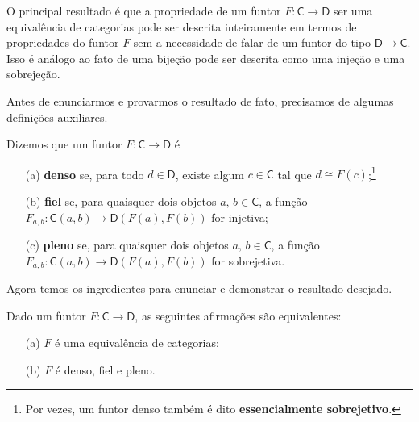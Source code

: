 O principal resultado é que a propriedade de um funtor $F: \mathsf{C} \to \mathsf{D}$ ser uma equivalência de categorias pode ser descrita inteiramente em termos de propriedades do funtor $F$ sem a necessidade de falar de um funtor do tipo $\mathsf{D} \to \mathsf{C}$.
Isso é análogo ao fato de uma bijeção pode ser descrita como uma injeção e uma sobrejeção.

Antes de enunciarmos e provarmos o resultado de fato, precisamos de algumas definições auxiliares.

\begin{defin}
  Dizemos que um funtor $F: \mathsf{C} \to \mathsf{D}$ é
  \begin{enumerate}
  \item[(a)] \textbf{denso} se, para todo $d \in \mathsf{D}$, existe algum $c \in \mathsf{C}$ tal que $d \cong F(c)$;\footnote{Por vezes, um funtor denso também é dito \textbf{essencialmente sobrejetivo}.}
    
  \item[(b)] \textbf{fiel} se, para quaisquer dois objetos $a,\,b \in \mathsf{C}$, a função $F_{a,b}: \mathsf{C}(a,b) \to \mathsf{D}(F(a),F(b))$ for injetiva;
    
  \item[(c)] \textbf{pleno} se, para quaisquer dois objetos $a,\,b \in \mathsf{C}$, a função $F_{a,b}: \mathsf{C}(a,b) \to \mathsf{D}(F(a),F(b))$ for sobrejetiva.
  \end{enumerate}
\end{defin}

Agora temos os ingredientes para enunciar e demonstrar o resultado desejado.

\begin{teo}
  \label{teo:equiv_sse_denso_fiel_pleno}
  Dado um funtor $F: \mathsf{C} \to \mathsf{D}$, as seguintes afirmações são equivalentes:
  \begin{enumerate}
  \item[(a)] $F$ é uma equivalência de categorias;
    
  \item[(b)] $F$ é denso, fiel e pleno.
  \end{enumerate}
\end{teo}

